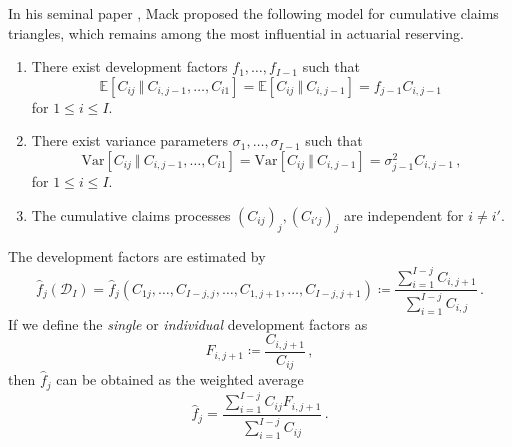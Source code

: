 \documentclass[a4paper]{book}
\begin{document}
In his seminal paper \cite{mack:chain-ladder}, Mack proposed the following model for cumulative claims triangles, which remains among the most influential in actuarial reserving.
\begin{model} \label{model:mack} \leavevmode
  \begin{enumerate}[label=\bf{\textup{(}Mack\arabic*\textup{)}},ref=\textup{(}Mack\arabic*\textup{)}, wide]
    \item \label{assump:mack-expectation} There exist development factors $f_1, \dots, f_{I - 1}$ such that
          \begin{equation}
            \mathbb{E}[C_{ij} \ \Vert \ C_{i, j - 1}, \dots, C_{i1}] = \mathbb{E}[C_{ij} \ \Vert \ C_{i, j - 1}] = f_{j - 1} C_{i, j - 1}\,
          \end{equation}
          for $1 \leq i \leq I$.
    \item \label{assump:mack-variance} There exist variance parameters $\sigma_1, \dots, \sigma_{I - 1}$ such that
          \begin{equation}
            \mathrm{Var}[C_{ij} \ \Vert \ C_{i, j - 1}, \dots, C_{i1}] = \mathrm{Var}[C_{ij} \ \Vert \ C_{i, j - 1}] = \sigma_{j - 1}^2 C_{i, j - 1}\,,
          \end{equation}
          for $1 \leq i \leq I$.
    \item \label{assump:mack-independence} The cumulative claims processes $(C_{ij})_j, (C_{i'j})_j$ are independent for $i \neq i'$.
  \end{enumerate}
\end{model}
The development factors are estimated by
\begin{equation} \label{eq:devfac-estimator}
  \widehat{f}_j(\mathcal{D}_I) = \widehat{f}_j(C_{1j}, \dots, C_{I - j, j}, \dots, C_{1, j + 1}, \dots, C_{I - j, j + 1}) \coloneqq \frac{\sum_{i = 1}^{I - j} C_{i, j + 1}}{\sum_{i = 1}^{I - j} C_{i, j}} \,.
\end{equation}
If we define the \emph{single} or \emph{individual} development factors as
\begin{equation}
  F_{i, j + 1} \coloneqq \frac{C_{i, j + 1}}{C_{ij}} \,,
\end{equation}
then $\widehat{f}_j$ can be obtained as the weighted average
\begin{equation}
  \widehat{f}_j = \frac{\sum_{i = 1}^{I - j} C_{ij} F_{i, j + 1}}{\sum_{i = 1}^{I - j} C_{ij}} \,.
\end{equation}
\end{document}
